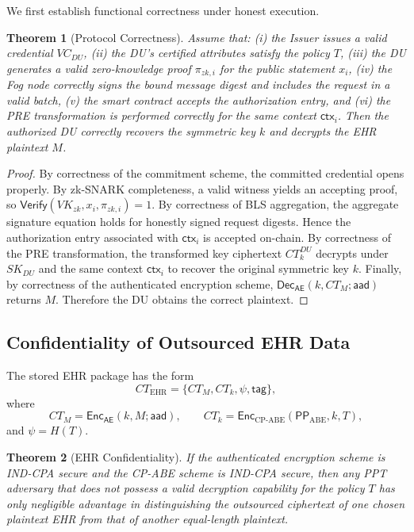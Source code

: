 \documentclass[conference]{IEEEtran}
\newtheorem{theorem}{Theorem}
\begin{document}
We first establish functional correctness under honest execution.

\begin{theorem}[Protocol Correctness]
Assume that: (i) the Issuer issues a valid credential $VC_{DU}$, (ii) the DU's certified attributes satisfy the policy $T$, (iii) the DU generates a valid zero-knowledge proof $\pi_{zk,i}$ for the public statement $x_i$, (iv) the Fog node correctly signs the bound message digest and includes the request in a valid batch, (v) the smart contract accepts the authorization entry, and (vi) the PRE transformation is performed correctly for the same context $\mathsf{ctx}_i$. Then the authorized DU correctly recovers the symmetric key $k$ and decrypts the EHR plaintext $M$.
\end{theorem}

\begin{proof}
By correctness of the commitment scheme, the committed credential opens properly. By zk-SNARK completeness, a valid witness yields an accepting proof, so $\textsf{Verify}(VK_{zk},x_i,\pi_{zk,i})=1$. By correctness of BLS aggregation, the aggregate signature equation holds for honestly signed request digests. Hence the authorization entry associated with $\mathsf{ctx}_i$ is accepted on-chain. By correctness of the PRE transformation, the transformed key ciphertext $CT_k^{DU}$ decrypts under $SK_{DU}$ and the same context $\mathsf{ctx}_i$ to recover the original symmetric key $k$. Finally, by correctness of the authenticated encryption scheme, $\textsf{Dec}_{\textsf{AE}}(k,CT_M;\textsf{aad})$ returns $M$. Therefore the DU obtains the correct plaintext.
\end{proof}

\subsection{Confidentiality of Outsourced EHR Data}

The stored EHR package has the form
\[
CT_{\mathrm{EHR}} = \{CT_M,CT_k,\psi,\mathsf{tag}\},
\]
where
\[
CT_M = \textsf{Enc}_{\textsf{AE}}(k,M;\textsf{aad}),
\qquad
CT_k = \textsf{Enc}_{\mathrm{CP\text{-}ABE}}(\mathsf{PP}_{\mathrm{ABE}},k,T),
\]
and $\psi=H(T)$.

\begin{theorem}[EHR Confidentiality]
If the authenticated encryption scheme is IND-CPA secure and the CP-ABE scheme is IND-CPA secure, then any PPT adversary that does not possess a valid decryption capability for the policy $T$ has only negligible advantage in distinguishing the outsourced ciphertext of one chosen plaintext EHR from that of another equal-length plaintext.
\end{theorem}
\end{document}
